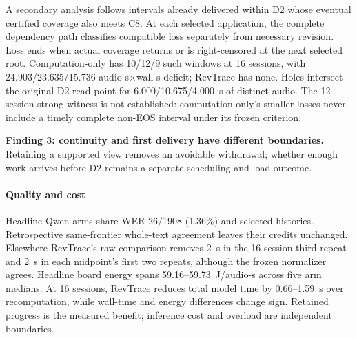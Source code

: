A secondary analysis follows intervals already delivered within D2 whose
eventual certified coverage also meets C8. At each selected application,
the complete dependency path classifies compatible loss separately from
necessary revision. Loss ends when actual coverage returns or is
right-censored at the next selected root. Computation-only has 10/12/9
such windows at 16 sessions, with 24.903/23.635/15.736 audio-s$\times$wall-s
deficit; RevTrace has none. Holes intersect the original D2 read point
for 6.000/10.675/4.000~s of distinct audio. The 12-session strong witness
is not established: computation-only's smaller losses never include a
timely complete non-EOS interval under its frozen criterion.
\par\noindent\textbf{Finding 3: continuity and first delivery have different boundaries.}
Retaining a supported view removes an avoidable withdrawal; whether
enough work arrives before D2 remains a separate scheduling and load outcome.

\paragraph{Quality and cost}
Headline Qwen arms share WER 26/1908 (1.36\%) and selected histories.
Retrospective same-frontier whole-text agreement leaves their credits
unchanged. Elsewhere RevTrace's raw comparison removes 2~s in the 16-session third
repeat and 2~s in each midpoint's first two repeats, although the frozen
normalizer agrees. Headline board
energy spans 59.16--59.73~J/audio-s across five arm medians. At 16 sessions, RevTrace reduces total
model time by 0.66--1.59~s over recomputation, while wall-time and energy
differences change sign. Retained progress is the measured benefit;
inference cost and overload are independent boundaries.
